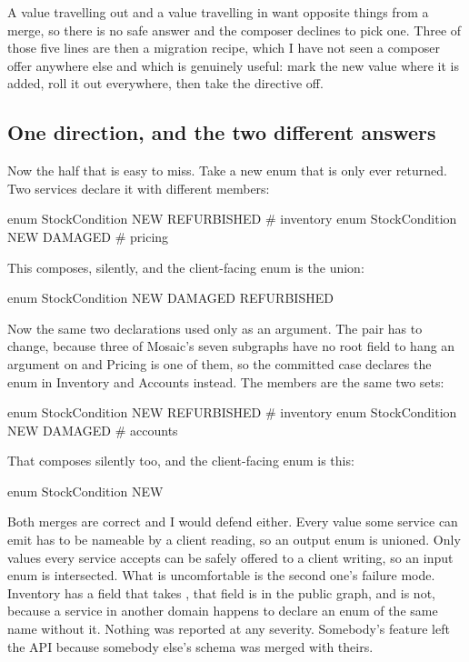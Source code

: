 A
value travelling out and a value travelling in want opposite things from a merge,
so there is no safe answer and the composer declines to pick one. Three of those
five lines are then a migration recipe, which I have not seen a composer offer
anywhere else and which is genuinely useful: mark the new value
 where it is added, roll it out everywhere, then take the
directive off.

\subsection*{One direction, and the two different answers}

%
Now the half that is easy to miss. Take a new enum that is only ever returned.
Two services declare it with different members:

\begin{graphqlsdl}[fontsize=\footnotesize]
enum StockCondition { NEW  REFURBISHED }   # inventory
enum StockCondition { NEW  DAMAGED }       # pricing
\end{graphqlsdl}

This composes, silently, and the client-facing enum is the union:

\begin{graphqlsdl}[fontsize=\footnotesize]
enum StockCondition { NEW  DAMAGED  REFURBISHED }
\end{graphqlsdl}

%
Now the same two declarations used only as an argument. The pair has to change,
because three of Mosaic's seven subgraphs have no root field to hang an argument
on and Pricing is one of them, so the committed case declares the enum in
Inventory and Accounts instead. The members are the same two sets:

\begin{graphqlsdl}[fontsize=\footnotesize]
enum StockCondition { NEW  REFURBISHED }   # inventory
enum StockCondition { NEW  DAMAGED }       # accounts
\end{graphqlsdl}

That composes silently too, and the client-facing enum is this:

\begin{graphqlsdl}[fontsize=\footnotesize]
enum StockCondition { NEW }
\end{graphqlsdl}

Both merges are correct and I would defend either. Every value some service can
emit has to be nameable by a client reading, so an output enum is unioned. Only
values every service accepts can be safely offered to a client writing, so an
input enum is intersected. What is uncomfortable is the second one's failure
mode. Inventory has a field that takes , that field is in the
public graph, and  is not, because a service in another domain
happens to declare an enum of the same name without it. Nothing was reported at
any severity. Somebody's feature left the API because somebody else's schema was
merged with theirs.

